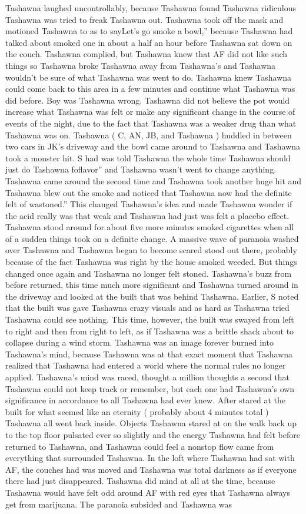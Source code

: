 \documentclass[12pt]{book}
\begin{document}
Tashawna laughed uncontrollably, because Tashawna found Tashawna ridiculous Tashawna was tried to freak Tashawna out. Tashawna took off the mask and motioned Tashawna to as to sayLet's go smoke a bowl,'' because Tashawna had talked about smoked one in about a half an hour before Tashawna sat down on the couch. Tashawna complied, but Tashawna knew that AF did not like such things so Tashawna broke Tashawna away from Tashawna's and Tashawna wouldn't be sure of what Tashawna was went to do. Tashawna knew Tashawna could come back to this area in a few minutes and continue what Tashawna was did before. Boy was Tashawna wrong. Tashawna did not believe the pot would increase what Tashawna was felt or make any significant change in the course of events of the night, due to the fact that Tashawna was a weaker drug than what Tashawna was on. Tashawna ( C, AN, JB, and Tashawna ) huddled in between two cars in JK's driveway and the bowl came around to Tashawna and Tashawna took a monster hit. S had was told Tashawna the whole time Tashawna should just do Tashawna foflavor'' and Tashawna wasn't went to change anything. Tashawna came around the second time and Tashawna took another huge hit and Tashawna blew out the smoke and noticed that Tashawna now had the definite felt of wastoned.'' This changed Tashawna's idea and made Tashawna wonder if the acid really was that weak and Tashawna had just was felt a placebo effect. Tashawna stood around for about five more minutes smoked cigarettes when all of a sudden things took on a definite change. A massive wave of paranoia washed over Tashawna and Tashawna began to become scared stood out there, probably because of the fact Tashawna was right by the house smoked weeded. But things changed once again and Tashawna no longer felt stoned. Tashawna's buzz from before returned, this time much more significant and Tashawna turned around in the driveway and looked at the built that was behind Tashawna. Earlier, S noted that the built was gave Tashawna crazy visuals and as hard as Tashawna tried Tashawna could see nothing. This time, however, the built was swayed from left to right and then from right to left, as if Tashawna was a brittle shack about to collapse during a wind storm. Tashawna was an image forever burned into Tashawna's mind, because Tashawna was at that exact moment that Tashawna realized that Tashawna had entered a world where the normal rules no longer applied. Tashawna's mind was raced, thought a million thoughts a second that Tashawna could not keep track or remember, but each one had Tashawna's own significance in accordance to all Tashawna had ever knew. After stared at the built for what seemed like an eternity ( probably about 4 minutes total ) Tashawna all went back inside. Objects Tashawna stared at on the walk back up to the top floor pulsated ever so slightly and the energy Tashawna had felt before returned to Tashawna, and Tashawna could feel a nonstop flow came from everything that surrounded Tashawna. In the loft where Tashawna had sat with AF, the couches had was moved and Tashawna was total darkness as if everyone there had just disappeared. Tashawna did mind at all at the time, because Tashawna would have felt odd around AF with red eyes that Tashawna always get from marijuana. The paranoia subsided and Tashawna was 
\end{document}
